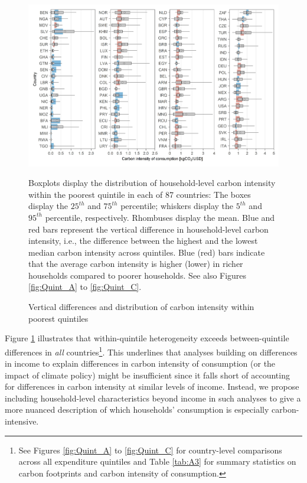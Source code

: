 \documentclass[12pt, a4paper]{article}
\newenvironment{subcaption}
{\strut
\vspace{-5pt}
\begin{minipage}[b]{0.9\textwidth}
  \hspace*{-\parindent}
  \footnotesize}
 {\end{minipage}}
\begin{document}
\begin{figure}[ht!]
    \centering
    \includegraphics{Figure 1/Figure_1_2017}
    \caption{Vertical differences and distribution of carbon intensity within poorest quintiles}
    \label{fig:fig_1}
    \begin{subcaption}
    Boxplots display the distribution of household-level carbon intensity within the poorest quintile in each of 87 countries: The boxes display the $25^{th}$ and $75^{th}$ percentile; whiskers display the $5^{th}$ and $95^{th}$ percentile, respectively. Rhombuses display the mean. Blue and red bars represent the vertical difference in household-level carbon intensity, i.e., the difference between the highest and the lowest median carbon intensity across quintiles. Blue (red) bars indicate that the average carbon intensity is higher (lower) in richer households compared to poorer households. See also Figures \ref{fig:Quint_A} to \ref{fig:Quint_C}.
    \end{subcaption}
\end{figure}

Figure \ref{fig:fig_1} illustrates that within-quintile heterogeneity exceeds between-quintile differences in \textit{all} countries\footnote{See Figures \ref{fig:Quint_A} to \ref{fig:Quint_C} for country-level comparisons across all expenditure quintiles and Table \ref{tab:A3} for summary statistics on carbon footprints and carbon intensity of consumption.}. This underlines that analyses building on differences in income to explain differences in carbon intensity of consumption (or the impact of climate policy) might be insufficient since it falls short of accounting for differences in carbon intensity at similar levels of income. Instead, we propose including household-level characteristics beyond income in such analyses to give a more nuanced description of which households' consumption is especially carbon-intensive.
\end{document}
